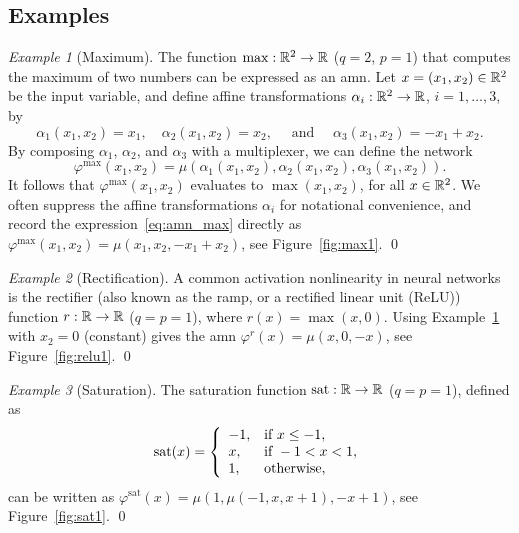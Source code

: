 \documentclass[10pt]{article}
\newcommand{\sat}{\mathop{\rm sat}}
\newcommand{\amn}{\varphi}
\theoremstyle{remark}
\newtheorem{example}{Example}
\theoremstyle{definition}
\theoremstyle{plain}
\begin{document}
\subsection{Examples}
\begin{example}[Maximum]\label{ex:max}
The function $\max:\mathbb{R}^2\to\mathbb{R}$ ($q=2$, $p=1$) that computes the maximum
of two numbers can be expressed as an \acs{amn}.
Let $x=(x_1,x_2)\in\mathbb{R}^2$ be the input variable, and define
affine transformations $\alpha_i:\mathbb{R}^2\to\mathbb{R}$, $i=1,\ldots,3$, by
\[
	\alpha_1(x_1,x_2) = x_1, \quad
	\alpha_2(x_1,x_2) = x_2, \quad
	\text{ and } \quad
	\alpha_3(x_1,x_2) = -x_1+x_2.
\]
By composing $\alpha_1$, $\alpha_2$, and $\alpha_3$ with a multiplexer, we can
define the network
\begin{equation}
	\label{eq:amn_max}
	\amn^\mathrm{max}(x_1,x_2)=
	\mu(\alpha_1(x_1,x_2),\alpha_2(x_1,x_2),\alpha_3(x_1,x_2)).
\end{equation}
It follows that $\amn^\mathrm{max}(x_1,x_2)$ evaluates to $\max(x_1,x_2)$,
for all $x\in\mathbb{R}^2$. 
We often suppress the affine transformations $\alpha_i$ for notational
convenience, and record the expression~\eqref{eq:amn_max} directly as
$\amn^\mathrm{max}(x_1,x_2)=\mu(x_1,x_2,-x_1+x_2)$, see Figure~\ref{fig:max1}.
\qed
\end{example}

\begin{example}[Rectification]\label{ex:relu}
A common activation nonlinearity in neural networks is the rectifier (also
known as the ramp, or a rectified linear unit (ReLU)) function
$r:\mathbb{R}\to\mathbb{R}$ ($q=p=1$), where
$r(x)=\max(x,0)$.
Using Example~\ref{ex:max} with $x_2=0$ (constant) gives
the \acs{amn} 
$\amn^r(x)=\mu(x,0,-x)$, 
see Figure~\ref{fig:relu1}.
\qed
\end{example}

\begin{example}[Saturation]\label{ex:sat}
The saturation function $\sat:\reals\to\reals$ ($q=p=1$), defined as
\[
	\sat(x) = \left\{
	\begin{array}{ll}
		-1, & \text{if } x \leq -1,\\
		x, & \text{if } -1 < x < 1,\\
		1, & \text{otherwise},
	\end{array}
	\right.
\]
can be written as
$\amn^\mathrm{sat}(x)=\mu(1,\mu(-1,x,x+1),-x+1)$, see Figure~\ref{fig:sat1}.
\qed
\end{example}
\end{document}
